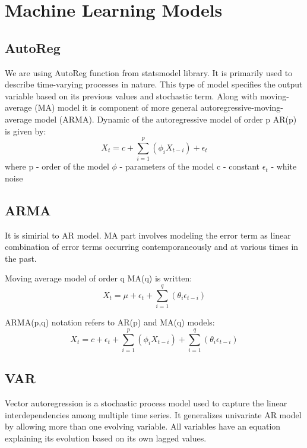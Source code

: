 \documentclass[conference]{IEEEtran}
\begin{document}
\section{Machine Learning Models}
\subsection{AutoReg}
We are using AutoReg function from statsmodel library. 
 It is primarily used  to describe time-varying processes in nature. This type of model specifies the output
  variable based on its previous values and stochastic term. Along with moving-average (MA) model it is component of more general autoregressive-moving-average
  model (ARMA). Dynamic of the autoregressive model of order p AR(p) is given by:
\begin{equation}
    X_t = c + \sum_{i=1}^{p} (\phi_iX_{t-i}) + \epsilon_t
\end{equation}
where
p - order of the model\newline
$ \phi $ - parameters of the model\newline
c - constant\newline
$\epsilon_t$ - white noise\newline

\subsection{ARMA}
It is simirial to AR model. MA part involves modeling the error term as linear combination of error terms  occurring contemporaneously and at various times in the past.


Moving average model of order q MA(q) is written:
\begin{equation}
    X_t = \mu + \epsilon_t + \sum_{i=1}^{q} (\theta_i\epsilon_{t-i})
\end{equation}

ARMA(p,q) notation refers to AR(p) and MA(q) models:
\begin{equation}
    X_t = c + \epsilon_t +\sum_{i=1}^{p} (\phi_iX_{t-i}) + \sum_{i=1}^{q} (\theta_i\epsilon_{t-i})
\end{equation}

\subsection{VAR}
Vector autoregression is a stochastic process model used to capture the linear interdependencies among multiple time series. It generalizes univariate AR model by allowing more 
than one evolving variable. All variables have an equation explaining its evolution based on its own lagged values.
\end{document}
